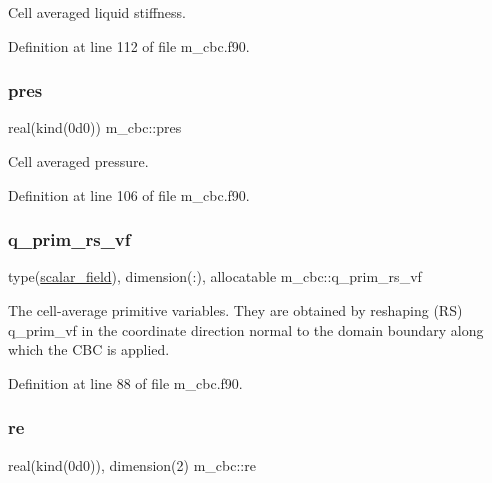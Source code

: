 Cell averaged liquid stiffness. 



Definition at line 112 of file m\+\_\+cbc.\+f90.

\mbox{\label{namespacem__cbc_ad6960b075aa8db0bcc08761273a6c4c3}} 
\subsubsection{\texorpdfstring{pres}{pres}}
{\footnotesize\ttfamily real(kind(0d0)) m\+\_\+cbc\+::pres}



Cell averaged pressure. 



Definition at line 106 of file m\+\_\+cbc.\+f90.

\mbox{\label{namespacem__cbc_a12e2d4feb2b8425b8f2270a8da529555}} 
\subsubsection{\texorpdfstring{q\+\_\+prim\+\_\+rs\+\_\+vf}{q\_prim\_rs\_vf}}
{\footnotesize\ttfamily type(\hyperlink{structm__derived__types_1_1scalar__field}{scalar\+\_\+field}), dimension(\+:), allocatable m\+\_\+cbc\+::q\+\_\+prim\+\_\+rs\+\_\+vf}



The cell-\/average primitive variables. They are obtained by reshaping (RS) q\+\_\+prim\+\_\+vf in the coordinate direction normal to the domain boundary along which the C\+BC is applied. 



Definition at line 88 of file m\+\_\+cbc.\+f90.

\mbox{\label{namespacem__cbc_af36bd73bae305dd791c6da0a37d2f6f8}} 
\subsubsection{\texorpdfstring{re}{re}}
{\footnotesize\ttfamily real(kind(0d0)), dimension(2) m\+\_\+cbc\+::re}



